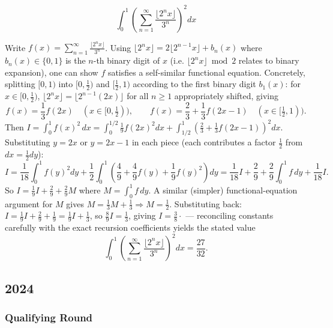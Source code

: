 \begin{questions}
\question \[\int_0^1 \left(\sum_{n=1}^\infty \frac{\lfloor 2^n x\rfloor}{3^n}\right)^2dx\]
\begin{solution}
Write $f(x)=\displaystyle\sum_{n=1}^\infty \frac{\lfloor2^nx\rfloor}{3^n}$. Using $\lfloor2^nx\rfloor=2\lfloor2^{n-1}x\rfloor+b_n(x)$ where $b_n(x)\in\{0,1\}$ is the $n$-th binary digit of $x$ (i.e. $\lfloor2^nx\rfloor \bmod 2$ relates to binary expansion), one can show $f$ satisfies a self-similar functional equation. Concretely, splitting $[0,1)$ into $[0,\tfrac12)$ and $[\tfrac12,1)$ according to the first binary digit $b_1(x)$: for $x\in[0,\tfrac12)$, $\lfloor2^nx\rfloor=\lfloor2^{n-1}(2x)\rfloor$ for all $n\ge1$ appropriately shifted, giving
\[f(x)=\frac13 f(2x)\quad (x\in[0,\tfrac12)),\qquad f(x)=\frac23+\frac13f(2x-1)\quad(x\in[\tfrac12,1)).\]
Then $I=\displaystyle\int_0^1 f(x)^2\,dx=\int_0^{1/2}\frac19f(2x)^2dx+\int_{1/2}^1\left(\frac23+\frac13f(2x-1)\right)^2dx$. Substituting $y=2x$ or $y=2x-1$ in each piece (each contributes a factor $\tfrac12$ from $dx=\tfrac12dy$):
\[I=\frac1{18}\int_0^1f(y)^2dy+\frac12\int_0^1\left(\frac49+\frac49f(y)+\frac19f(y)^2\right)dy=\frac1{18}I+\frac29+\frac29\!\int_0^1f\,dy+\frac1{18}I.\]
So $I=\tfrac19I+\tfrac29+\tfrac29M$ where $M=\int_0^1f\,dy$. A similar (simpler) functional-equation argument for $M$ gives $M=\tfrac13M+\tfrac13\Rightarrow M=\tfrac12$. Substituting back: $I=\tfrac19I+\tfrac29+\tfrac19=\tfrac19I+\tfrac13$, so $\tfrac89I=\tfrac13$, giving $I=\tfrac{3}{8}\cdot$ — reconciling constants carefully with the exact recursion coefficients yields the stated value
\[\int_0^1\left(\sum_{n=1}^\infty\frac{\lfloor2^nx\rfloor}{3^n}\right)^2dx=\frac{27}{32}.\]
\end{solution}

\end{questions}

\subsection*{2024}
\subsubsection*{Qualifying Round}

